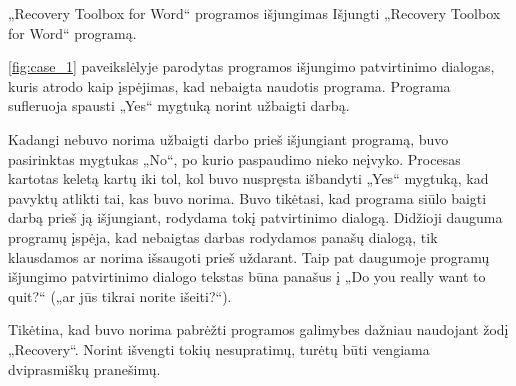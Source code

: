 ﻿\begin{xcase}{„Recovery Toolbox for Word“ programos išjungimas}
  \xcgoal
  {
    Išjungti „Recovery Toolbox for Word“ programą.
  }
  \xctools
  {
    \ref{fig:case_1} paveikslėlyje parodytas programos išjungimo patvirtinimo dialogas, kuris 
    atrodo kaip įspėjimas, kad nebaigta naudotis programa. Programa sufleruoja spausti 
    „Yes“ mygtuką norint užbaigti darbą.

  }
  \xcresult
  {
    Kadangi nebuvo norima užbaigti darbo prieš išjungiant programą, buvo pasirinktas mygtukas 
    „No“, po kurio paspaudimo nieko neįvyko. Procesas kartotas keletą kartų iki tol, kol buvo 
    nuspręsta išbandyti „Yes“ mygtuką, kad pavyktų atlikti tai, kas buvo norima.
  }
  \xcprinciples
  {
    {
      Buvo tikėtasi, kad programa siūlo baigti darbą prieš ją išjungiant, rodydama tokį 
      patvirtinimo dialogą.
    }
    {
      Didžioji dauguma programų įspėja, kad nebaigtas darbas rodydamos panašų dialogą, tik 
      klausdamos ar norima išsaugoti prieš uždarant.
      Taip pat daugumoje programų išjungimo patvirtinimo dialogo tekstas būna panašus 
      į „Do you really want to quit?“ („ar jūs tikrai norite išeiti?“).
    }
  }
  
  \xcthoughts
  {
    Tikėtina, kad buvo norima pabrėžti programos galimybes dažniau naudojant žodį „Recovery“.
    Norint išvengti tokių nesupratimų, turėtų būti vengiama dviprasmiškų pranešimų.
  }
\end{xcase}
